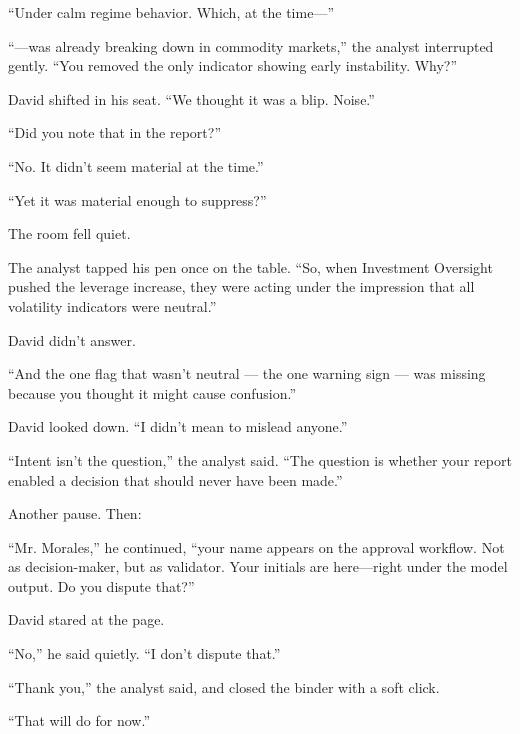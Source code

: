 ``Under calm regime behavior. Which, at the time—''

``—was already breaking down in commodity markets,'' the analyst interrupted gently. ``You removed the only 
indicator showing early instability. Why?''

David shifted in his seat. ``We thought it was a blip. Noise.''

``Did you note that in the report?''

``No. It didn’t seem material at the time.''

``Yet it was material enough to suppress?''

The room fell quiet.

The analyst tapped his pen once on the table. ``So, when Investment Oversight pushed the leverage increase, 
they were acting under the impression that all volatility indicators were neutral.''

David didn’t answer.

``And the one flag that wasn’t neutral — the one warning sign — was missing because you thought it might cause confusion.''

David looked down. ``I didn’t mean to mislead anyone.''

``Intent isn't the question,'' the analyst said. ``The question is whether your report enabled a decision that 
should never have been made.''

Another pause. Then:

``Mr. Morales,'' he continued, ``your name appears on the approval workflow. Not as decision-maker, but as 
validator. Your initials are here—right under the model output. Do you dispute that?''

David stared at the page.

``No,'' he said quietly. ``I don’t dispute that.''

``Thank you,'' the analyst said, and closed the binder with a soft click.

``That will do for now.''

\medskip

